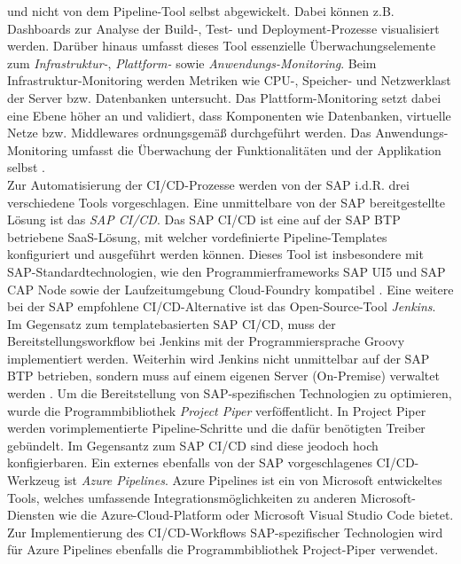 und nicht von dem Pipeline-Tool selbst abgewickelt. Dabei können z.B. Dashboards zur Analyse der Build-, Test- und Deployment-Prozesse visualisiert werden. Darüber hinaus umfasst dieses Tool essenzielle Überwachungselemente zum \textit{Infrastruktur-}, \textit{Plattform-} sowie \textit{Anwendungs-Monitoring}. Beim Infrastruktur-Monitoring werden Metriken wie CPU-, Speicher- und Netzwerklast der Server bzw. Datenbanken untersucht. Das Plattform-Monitoring setzt dabei eine Ebene höher an und validiert, dass Komponenten wie Datenbanken, virtuelle Netze bzw. Middlewares ordnungsgemäß durchgeführt werden. Das Anwendungs-Monitoring umfasst die Überwachung der Funktionalitäten und der Applikation selbst \cite[21]{Halstenberg.2020}.\\ 
Zur Automatisierung der CI/CD-Prozesse werden von der SAP i.d.R. drei verschiedene Tools vorgeschlagen. Eine unmittelbare von der SAP bereitgestellte Lösung ist das \textit{\ac{SAP CI/CD}}. Das SAP CI/CD ist eine auf der SAP BTP betriebene SaaS-Lösung, mit welcher vordefinierte Pipeline-Templates konfiguriert und ausgeführt werden können. Dieses Tool ist insbesondere mit SAP-Standardtechnologien, wie den Programmierframeworks SAP UI5 und SAP CAP Node sowie der Laufzeitumgebung Cloud-Foundry kompatibel \cite{.20230405}. Eine weitere bei der SAP empfohlene CI/CD-Alternative ist das Open-Source-Tool \textit{Jenkins}. Im Gegensatz zum templatebasierten SAP CI/CD, muss der Bereitstellungsworkflow bei Jenkins mit der Programmiersprache Groovy implementiert werden. Weiterhin wird Jenkins nicht unmittelbar auf der SAP BTP betrieben, sondern muss auf einem eigenen Server (On-Premise) verwaltet werden \cite[Kap. 2]{Labouardy.2021}. Um die Bereitstellung von SAP-spezifischen Technologien zu optimieren, wurde die Programmbibliothek \textit{Project Piper} verföffentlicht. In Project Piper werden vorimplementierte Pipeline-Schritte und die dafür benötigten Treiber gebündelt. Im Gegensantz zum SAP CI/CD sind diese jeodoch hoch konfigierbaren.
Ein externes ebenfalls von der SAP vorgeschlagenes CI/CD-Werkzeug ist \textit{Azure Pipelines}. Azure Pipelines ist ein von Microsoft entwickeltes Tools, welches umfassende Integrationsmöglichkeiten zu anderen Microsoft-Diensten wie die Azure-Cloud-Platform oder Microsoft Visual Studio Code bietet. Zur Implementierung des CI/CD-Workflows SAP-spezifischer Technologien wird für Azure Pipelines ebenfalls die Programmbibliothek Project-Piper verwendet.
